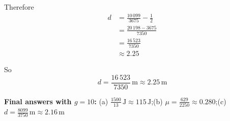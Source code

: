 \documentclass[leqno]{article}
\begin{document}
\begin{enumerate}[
  label=\textbf{\arabic*.},
  leftmargin=*,
  topsep=0pt,
  partopsep=0pt,
  parsep=0pt
]
\begin{djsSolution}
\begin{enumerate}[label=\textbf{(\alph*)}]
  Therefore
  \begin{align*}
  d
  &=\frac{10\,099}{3675}-\frac12\\
  &=\frac{20\,198-3675}{7350}\\
  &=\frac{16\,523}{7350}\\
  &\approx 2.25
  \end{align*}

  So
  \[
  d=\frac{16\,523}{7350}\,\mathrm{m}\approx 2.25\,\mathrm{m}
  \]
\end{enumerate}
\par\medskip\noindent\textbf{Final answers with \(g = 10\):} (a) \(\frac{1500}{13}\,\mathrm{J}\approx 115\,\mathrm{J}\);\quad (b) \(\mu = \frac{629}{2250}\approx 0.280\);\quad (c) \(d = \frac{8099}{3750}\,\mathrm{m}\approx 2.16\,\mathrm{m}\)
\end{djsSolution}


\end{enumerate}
\end{document}
